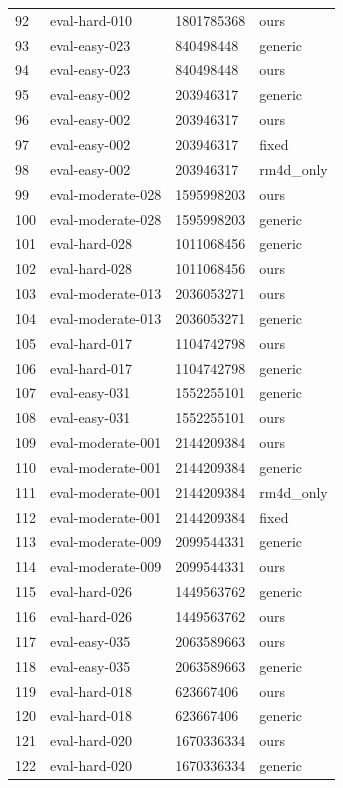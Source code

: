 \begin{tabular}{llll}
92 & eval-hard-010 & 1801785368 & ours \\
93 & eval-easy-023 & 840498448 & generic \\
94 & eval-easy-023 & 840498448 & ours \\
95 & eval-easy-002 & 203946317 & generic \\
96 & eval-easy-002 & 203946317 & ours \\
97 & eval-easy-002 & 203946317 & fixed \\
98 & eval-easy-002 & 203946317 & rm4d\_only \\
99 & eval-moderate-028 & 1595998203 & ours \\
100 & eval-moderate-028 & 1595998203 & generic \\
101 & eval-hard-028 & 1011068456 & generic \\
102 & eval-hard-028 & 1011068456 & ours \\
103 & eval-moderate-013 & 2036053271 & ours \\
104 & eval-moderate-013 & 2036053271 & generic \\
105 & eval-hard-017 & 1104742798 & ours \\
106 & eval-hard-017 & 1104742798 & generic \\
107 & eval-easy-031 & 1552255101 & generic \\
108 & eval-easy-031 & 1552255101 & ours \\
109 & eval-moderate-001 & 2144209384 & ours \\
110 & eval-moderate-001 & 2144209384 & generic \\
111 & eval-moderate-001 & 2144209384 & rm4d\_only \\
112 & eval-moderate-001 & 2144209384 & fixed \\
113 & eval-moderate-009 & 2099544331 & generic \\
114 & eval-moderate-009 & 2099544331 & ours \\
115 & eval-hard-026 & 1449563762 & generic \\
116 & eval-hard-026 & 1449563762 & ours \\
117 & eval-easy-035 & 2063589663 & ours \\
118 & eval-easy-035 & 2063589663 & generic \\
119 & eval-hard-018 & 623667406 & ours \\
120 & eval-hard-018 & 623667406 & generic \\
121 & eval-hard-020 & 1670336334 & ours \\
122 & eval-hard-020 & 1670336334 & generic \\

\end{tabular}

